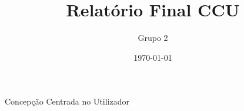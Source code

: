 \documentclass{report}
\title{Relatório Final CCU}
\author{Grupo 2}
\date{\today}
\begin{document}
\begin{acronym}
	 {Concepção Centrada no Utilizador}
\end{acronym}

\maketitle

\tableofcontents




















\end{document}
